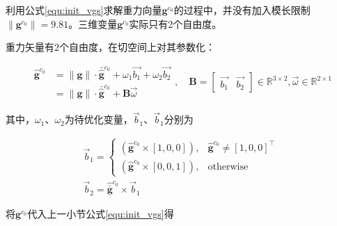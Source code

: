 \documentclass[12pt,a4paper]{article}
\begin{document}
利用公式\eqref{equ:init_vgs}求解重力向量$\mathbf{g}^{c_0}$的过程中，并没有加入模长限制$\|\mathbf{g}^{c_0}\|=9.81$。三维变量$\mathbf{g}^{c_0}$实际只有2个自由度。

重力矢量有2个自由度，在切空间上对其参数化：

\begin{equation}
\begin{aligned}
\hat{\mathbf{g}}^{c_0}
&=
\|\mathbf{g}\| \cdot \bar{\hat{\mathbf{g}}}^{c_0} + \omega_1 \vec{b_1} + \omega_2 \vec{b_2} \\ 
&=
\|\mathbf{g}\| \cdot \bar{\hat{\mathbf{g}}}^{c_0} + \mathbf{B} \vec{\omega}
\end{aligned} , \quad
\mathbf{B} 
=
\begin{bmatrix}
\vec{b_1} & \vec{b_2}
\end{bmatrix} 
\in \mathbb{R}^{3 \times 2}, \vec{\omega} \in \mathbb{R}^{2 \times 1}
\end{equation}

其中，$\omega_1$、$\omega_2$为待优化变量，$\vec{b}_{1}$、$\vec{b}_{1}$分别为

\begin{equation}
\begin{array}{l}{
\vec{b}_{1} =
\left\{\begin{array}{ll}
{\left(\hat{\mathbf{g}}^{c_{0}} \times [1,0,0] \right),} & 
{\hat{\mathbf{g}}^{c_{0}} \neq[1,0,0]^{\top}} \\ 
{\left(\hat{\mathbf{g}}^{c_{0}} \times [0,0,1] \right),} & {\text{otherwise}}
\end{array}\right.} 
\\ 
{\vec{b}_{2}=\hat{\overline{\mathbf{g}}}^{c_{0}} \times \vec{b}_{1}}
\end{array}
\end{equation}

将$\mathbf{g}^{c_0}$代入上一小节公式\eqref{equ:init_vgs}得
\end{document}

